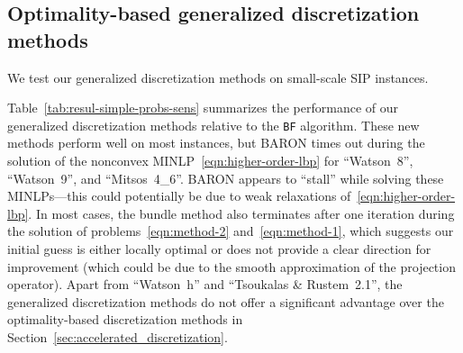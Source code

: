 \documentclass{article}
\newcommand{\1}[1]{\mathds{1}\left[#1\right]}
\begin{document}
\subsection{Optimality-based generalized discretization methods}



We test our generalized discretization methods on small-scale SIP instances.



Table~\ref{tab:resul-simple-probs-sens} summarizes the performance of our generalized discretization methods relative to the \texttt{BF} algorithm.
These new methods perform well on most instances, but BARON times out during the solution of the nonconvex MINLP~\eqref{eqn:higher-order-lbp} for ``Watson~8'', ``Watson~9'', and ``Mitsos~4\_6''.
BARON appears to ``stall'' while solving these MINLPs---this could potentially be due to weak relaxations of~\eqref{eqn:higher-order-lbp}.
In most cases, the bundle method also terminates after one iteration during the solution of problems~\eqref{eqn:method-2} and~\eqref{eqn:method-1}, which suggests our initial guess is either locally optimal or does not provide a clear direction for improvement (which could be due to the smooth approximation of the projection operator).
Apart from ``Watson~h'' and ``Tsoukalas \& Rustem~2.1'', the generalized discretization methods do not offer a significant advantage over the optimality-based discretization methods in Section~\ref{sec:accelerated_discretization}.
\end{document}

